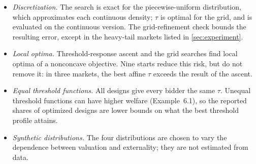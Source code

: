 \documentclass[11pt]{article}
\begin{document}
\begin{itemize}
    \item \emph{Discretization.} The search is exact for the piecewise-uniform distribution, which approximates each continuous density; $\tau$ is optimal for the grid, and is evaluated on the continuous version. The grid-refinement check bounds the resulting error, except in the heavy-tail markets listed in \cref{sec:experiment}.
    \item \emph{Local optima.} Threshold-response ascent and the grid searches find local optima of a nonconcave objective. Nine starts reduce this risk, but do not remove it: in three markets, the best affine $\tau$ exceeds the result of the ascent.
    \item \emph{Equal threshold functions.} All designs give every bidder the same $\tau$. Unequal threshold functions can have higher welfare (Example~6.1), so the reported shares of optimized designs are lower bounds on what the best threshold profile attains.
    \item \emph{Synthetic distributions.} The four distributions are chosen to vary the dependence between valuation and externality; they are not estimated from data.
\end{itemize}



\end{document}
